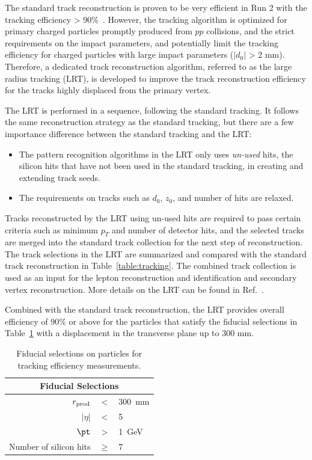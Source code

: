The standard track reconstruction is proven to be very efficient in Run 2 with the tracking efficiency > 90\%~\cite{Aaboud:2017all}. However, the tracking algorithm is optimized for primary charged particles promptly produced from $pp$ collisions, and the strict requirements on the impact parameters, \dzero and \zzero potentially limit the tracking efficiency for charged particles with large impact parameters ($|d_{0}|$ > 2 mm). Therefore, a dedicated track reconstruction algorithm, referred to as the large radius tracking (LRT), is developed to improve the track reconstruction efficiency for the tracks highly displaced from the primary vertex.

The LRT is performed in a sequence, following the standard tracking. It follows the same reconstruction strategy as the standard tracking, but there are a few importance difference between the standard tracking and the LRT:

\begin{itemize}
	\item The pattern recognition algorithms in the LRT only uses \textit{un-used} hits, the silicon hits that have not been used in the standard tracking, in creating and extending track seeds.
	\item The requirements on tracks such as $d_{0}$, $z_{0}$, and number of hits are relaxed.
\end{itemize}

Tracks reconstructed by the LRT using un-used hits are required to pass certain criteria such as minimum $p_{T}$ and number of detector hits, and the selected tracks are merged into the standard track collection for the next step of reconstruction. The track selections in the LRT are summarized and compared with the standard track reconstruction in Table~\ref{table:tracking}. The combined track collection is used as an input for the lepton reconstruction and identification and secondary vertex reconstruction. More details on the LRT can be found in Ref.~\cite{ATL-PHYS-PUB-2017-014}.

Combined with the standard track reconstruction, the LRT provides overall efficiency of $90\%$ or above for the particles that satisfy the fiducial selections in Table~\ref{table:TechEffTable} with a displacement in the transverse plane up to 300 \si{\milli\meter}.

\begin{table}[!htb]
\centering
\begin{tabular}{ r c l }
 \hline
 \hline
  \multicolumn{3}{c}{Fiducial Selections}  \\
 \hline
 $r_{\rm prod}$ & $<$ & 300~mm \\
$|\eta|$ & $<$ & 5 \\
 $\pt$ & $>$ & 1~GeV  \\
 Number of silicon hits & $\ge$ & 7  \\
\hline
\hline
\end{tabular}
\caption{Fiducial selections on particles for tracking efficiency measurements.}
\label{table:TechEffTable}
\end{table}



